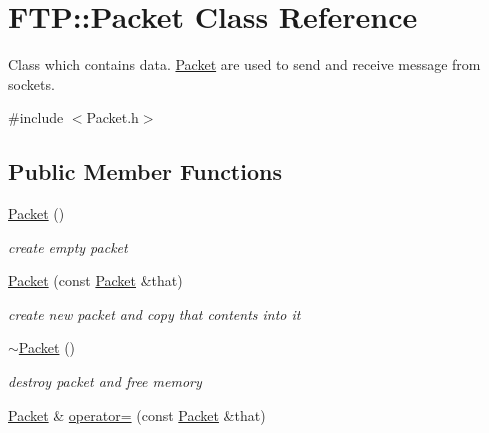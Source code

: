 \hypertarget{classFTP_1_1Packet}{}\section{F\+T\+P\+:\+:Packet Class Reference}
\label{classFTP_1_1Packet}


Class which contains data. \hyperlink{classFTP_1_1Packet}{Packet} are used to send and receive message from sockets.  




{\ttfamily \#include $<$Packet.\+h$>$}

\subsection*{Public Member Functions}
\begin{DoxyCompactItemize}
\item 
\hypertarget{classFTP_1_1Packet_a95e1b1075f22a60bca81da1740533595}{}\hyperlink{classFTP_1_1Packet_a95e1b1075f22a60bca81da1740533595}{Packet} ()\label{classFTP_1_1Packet_a95e1b1075f22a60bca81da1740533595}

\begin{DoxyCompactList}\small\item\em create empty packet \end{DoxyCompactList}\item 
\hypertarget{classFTP_1_1Packet_aa027c8478b3aa7a964a1c5c7a2e57eba}{}\hyperlink{classFTP_1_1Packet_aa027c8478b3aa7a964a1c5c7a2e57eba}{Packet} (const \hyperlink{classFTP_1_1Packet}{Packet} \&that)\label{classFTP_1_1Packet_aa027c8478b3aa7a964a1c5c7a2e57eba}

\begin{DoxyCompactList}\small\item\em create new packet and copy \textquotesingle{}that\textquotesingle{} contents into it \end{DoxyCompactList}\item 
\hypertarget{classFTP_1_1Packet_a0615f4be31088b859d770e6f620e357c}{}\hyperlink{classFTP_1_1Packet_a0615f4be31088b859d770e6f620e357c}{$\sim$\+Packet} ()\label{classFTP_1_1Packet_a0615f4be31088b859d770e6f620e357c}

\begin{DoxyCompactList}\small\item\em destroy packet and free memory \end{DoxyCompactList}\item 
\hypertarget{classFTP_1_1Packet_a896fef76d79779c046dcd1918bc3ee68}{}\hyperlink{classFTP_1_1Packet}{Packet} \& \hyperlink{classFTP_1_1Packet_a896fef76d79779c046dcd1918bc3ee68}{operator=} (const \hyperlink{classFTP_1_1Packet}{Packet} \&that)\label{classFTP_1_1Packet_a896fef76d79779c046dcd1918bc3ee68}


\end{DoxyCompactItemize}
